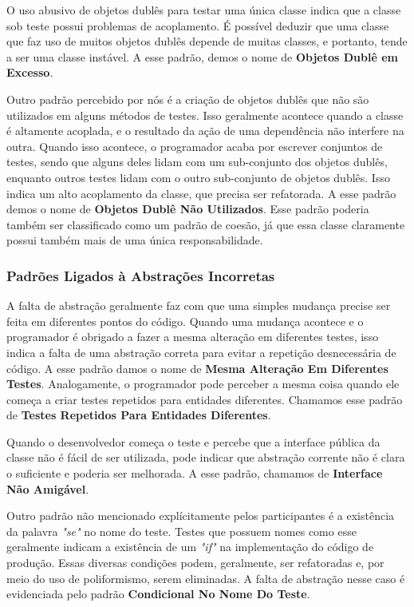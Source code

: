 \documentclass[conference]{IEEEtran}
\begin{document}
O uso abusivo de objetos dublês para testar uma
única classe indica que a classe sob teste possui problemas
de acoplamento. É possível deduzir que uma classe que faz uso de muitos
objetos dublês depende de muitas classes, e portanto, tende a ser
uma classe instável. A esse padrão, demos o nome de \textbf{Objetos Dublê em Excesso}.

Outro padrão percebido por nós é a criação de objetos dublês que não
são utilizados em alguns métodos de testes. Isso geralmente acontece quando
a classe é altamente acoplada, e o resultado da ação de uma dependência não
interfere na outra. Quando isso acontece, o programador acaba por escrever
conjuntos de testes, sendo que alguns deles lidam com um sub-conjunto dos objetos dublês,
enquanto outros testes lidam com o outro sub-conjunto de objetos dublês. 
Isso indica um alto acoplamento 
da classe, que precisa ser refatorada. A esse padrão demos o nome de
\textbf{Objetos Dublê Não Utilizados}. Esse padrão poderia também ser classificado
como um padrão de coesão, já que essa classe claramente possui também mais de uma
única responsabilidade.

\subsubsection{Padrões Ligados à Abstrações Incorretas}

A falta de abstração geralmente faz com que uma simples mudança precise
ser feita em diferentes pontos do código. Quando uma mudança acontece e 
o programador é obrigado a fazer a mesma alteração em diferentes testes,
isso indica a falta de uma abstração correta para evitar a 
repetição desnecessária de código.
A esse padrão damos o nome de \textbf{Mesma Alteração Em Diferentes Testes}.
Analogamente, o programador pode perceber a mesma coisa
quando ele começa a criar testes repetidos para entidades diferentes.
Chamamos esse padrão de \textbf{Testes Repetidos Para Entidades Diferentes}.

Quando o desenvolvedor começa o teste e percebe que a interface pública da classe
não é fácil de ser utilizada, pode indicar que abstração
corrente não é clara o suficiente e poderia ser melhorada. A esse padrão,
chamamos de \textbf{Interface Não Amigável}.

Outro padrão não mencionado explícitamente pelos participantes 
é a existência da palavra \textit{"se"} no nome do teste. Testes que
possuem nomes como esse geralmente indicam a existência de um \textit{"if"} na implementação
do código de produção. Essas diversas condições podem, geralmente, ser refatoradas e,
por meio do uso de poliformismo, serem eliminadas. A falta de abstração nesse caso
é evidenciada pelo padrão \textbf{Condicional No Nome Do Teste}.
\end{document}
